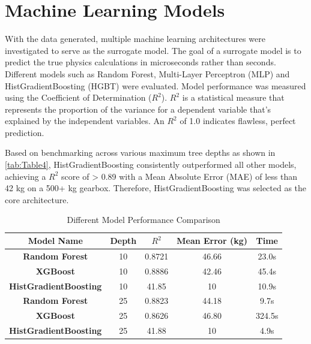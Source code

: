\section{Machine Learning Models}
    With the data generated, multiple machine learning architectures were investigated to serve as 
    the surrogate model. The goal of a surrogate model is to predict the true physics calculations in 
    microseconds rather than seconds. Different models such as Random Forest, Multi-Layer Perceptron (MLP) 
    and HistGradientBoosting (HGBT) were evaluated. Model performance was measured using the Coefficient of 
    Determination ($R^2$). $R^2$ is a statistical measure that represents the proportion of the variance 
    for a dependent variable that's explained by the independent variables. An $R^2$ of 1.0 indicates 
    flawless, perfect prediction.

    Based on benchmarking across various maximum tree depths as shown in \autoref{tab:Table4}, 
    HistGradientBoosting consistently outperformed all other models, achieving a $R^2$ score of > 0.89 
    with a Mean Absolute Error (MAE) of less than 42 kg on a 500+ kg gearbox. Therefore, HistGradientBoosting 
    was selected as the core architecture.
        \begin{table}[ht]
			\renewcommand{\arraystretch}{1.5}
			\centering
			\caption{Different Model Performance Comparison}
			\label{tab:Table4}
			\small
			\begin{tabular}{|c|c|c|c|c|}
				\hline
        		\textbf{Model Name} & \textbf{Depth} & \textbf{$R^2$} & \textbf{Mean Error (kg)} & \textbf{Time} \\					
				\hline
				\textbf{Random Forest} & 10 & 0.8721 & 46.66 & 23.0s \\
				\hline
				\textbf{XGBoost} & 10 & 0.8886 & 42.46 & 45.4s \\
				\hline
				\textbf{HistGradientBoosting} & 10 & 41.85 & 10 & 10.9s \\
				\hline
				\textbf{Random Forest} & 25 & 0.8823 & 44.18 & 9.7s \\
				\hline
				\textbf{XGBoost} & 25 & 0.8626 & 46.80 & 324.5s \\
				\hline
				\textbf{HistGradientBoosting} & 25 & 41.88 & 10 & 4.9s \\
				\hline
            \end{tabular}
		\end{table}

